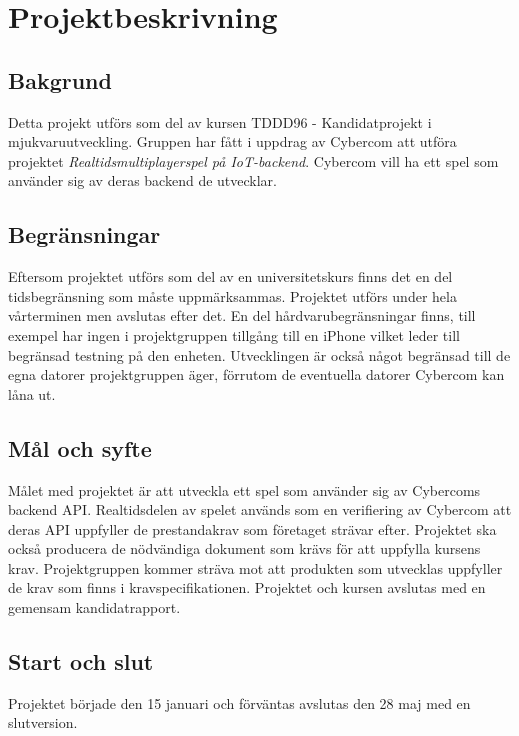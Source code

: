 \section{Projektbeskrivning}

\subsection{Bakgrund}
Detta projekt utförs som del av kursen TDDD96 - Kandidatprojekt i \\mjukvaruutveckling. Gruppen har fått i uppdrag av Cybercom att utföra projektet \textit{Realtidsmultiplayerspel på IoT-backend}. Cybercom vill ha ett spel som använder sig av deras backend de utvecklar.

\subsection{Begränsningar}
Eftersom projektet utförs som del av en universitetskurs finns det en del tidsbegränsning som måste uppmärksammas. Projektet utförs under hela vårterminen men avslutas efter det. En del hårdvarubegränsningar finns, till exempel har ingen i projektgruppen tillgång till en iPhone vilket leder till begränsad testning på den enheten. Utvecklingen är också något begränsad till de egna datorer projektgruppen äger, förrutom de eventuella datorer Cybercom kan låna ut.

\subsection{Mål och syfte}
Målet med projektet är att utveckla ett spel som använder sig av Cybercoms backend API. Realtidsdelen av spelet används som en verifiering av Cybercom att deras API uppfyller de prestandakrav som företaget strävar efter. Projektet ska också producera de nödvändiga dokument som krävs för att uppfylla kursens krav. Projektgruppen kommer sträva mot att produkten som utvecklas uppfyller de krav som finns i kravspecifikationen. Projektet och kursen avslutas med en gemensam kandidatrapport.



\subsection{Start och slut}
Projektet började den 15 januari och förväntas avslutas den 28 maj med en slutversion.

